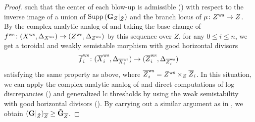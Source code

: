 \documentclass[12pt]{amsart}
\theoremstyle{definition}
\begin{document}
\begin{proof}
such that the center of each blow-up is admissible (\cite[(1.2)]{resolution-1}) with respect to the inverse image of a union of ${\rm Supp}\,(\boldsymbol{\rm G}_{Z}|_{\tilde{Z}})$ and the branch locus of $\mu \colon Z^{\rm ws} \to Z$. 
By the complex analytic analog of \cite[Chapter 2, Lemma 8.3]{karu-phdthesis} and taking the base change of $f^{\rm ws}\colon (X^{\rm ws},\Delta_{X^{\rm ws}}) \to (Z^{\rm ws},\Delta_{Z^{\rm ws}})$ by this sequence over $Z$, for any $0\leq i \leq n$, we get a toroidal and weakly semistable morphism with good horizontal divisors
$$\overline{f}^{\rm ws}_{i}\colon  (\overline{X}^{\rm ws}_{i},\Delta_{\overline{X}^{\rm ws}_{i}}) \to (\overline{Z}^{\rm ws}_{i},\Delta_{\overline{Z}^{\rm ws}_{i}})$$
 satisfying the same property as above, where $\overline{Z}^{\rm ws}_{i}=Z^{\rm ws} \times_{Z}\overline{Z}_{i}$. 
In this situation, we can apply the complex analytic analog of \cite[Theorem 3.2]{ambro-phdthesis} and direct computations of log discrepancies (\cite[Lemma 2.29]{kollar-mori}) and generalized lc thresholds by using the weak semistability with good horizontal divisors (\cite[Definition 9.1]{karu-phdthesis}).  
By carrying out a similar argument as in \cite[Proof of Theorem 4.13]{filipazzi-gen-can-bundle-formula}, we obtain $(\boldsymbol{\rm G}|_{\tilde{Z}})_{\overline{Z}} \geq \tilde{\boldsymbol{\rm G}}_{\overline{Z}}$. 


\end{proof}
\end{document}
